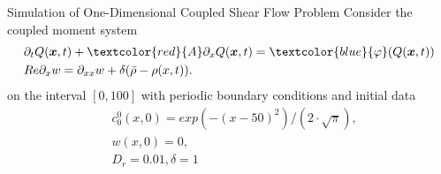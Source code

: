 \begin{frame}{Simulation of One-Dimensional Coupled Shear Flow Problem}
\scriptsize
Consider the coupled moment system
\begin{equation}
	\begin{split}
		&\partial_t Q(\boldsymbol{x},t) + \textcolor{red}{A}\partial_x Q(\boldsymbol{x},t) = \textcolor{blue}{\varphi} (Q(\boldsymbol{x},t)) \\
		&Re\partial_{x}w = \partial_{xx}w + \delta(\bar{\rho}-\rho(x,t)).
	\end{split}
	\label{coupledsys_1d}
\end{equation}
on the interval $[0, 100]$ with periodic boundary conditions and initial data
\begin{align*}
	&c^0_0(x,0) = exp(-(x-50)^2)/(2 \cdot \sqrt{\pi}), \\
	&w(x,0) = 0 ,\\
	&D_r = 0.01, \delta = 1
\end{align*}
\end{frame}


